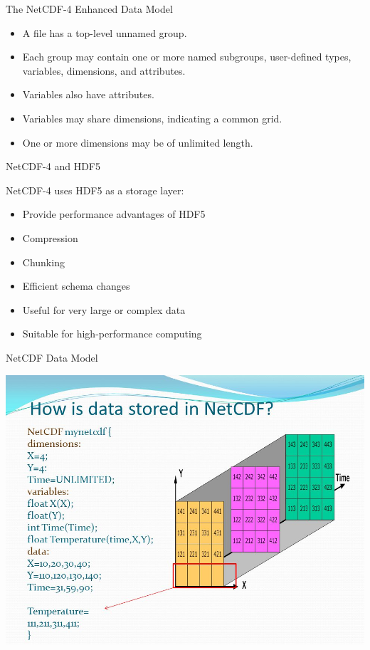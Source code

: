 \documentclass[compress,11pt,xcolor=svgnames,aspectratio=169]{beamer}
\begin{document}
\begin{frame}[t]{The NetCDF-4 Enhanced Data Model}

    \begin{itemize}
    \setlength\itemsep{0.3cm}
        \item A file has a top-level unnamed group.
        \item Each group may contain one or more named subgroups, user-defined types, variables, dimensions, and attributes.
        \item Variables also have attributes.
        \item Variables may share dimensions, indicating a common grid.
        \item One or more dimensions may be of unlimited length.
    \end{itemize}

\end{frame}

\begin{frame}[t]{NetCDF-4 and HDF5}

NetCDF-4 uses HDF5 as a storage layer:

\begin{itemize}
\setlength\itemsep{0.4cm}

    \item Provide performance advantages of HDF5
    \item Compression
    \item Chunking
    \item Efficient schema changes
    \item Useful for very large or complex data
    \item Suitable for high-performance computing

\end{itemize}

\end{frame}

\begin{frame}[t]{NetCDF Data Model}

\begin{center}
\includegraphics[scale=0.4]{fig/netcdf-data}
\end{center}

\end{frame}
\end{document}
